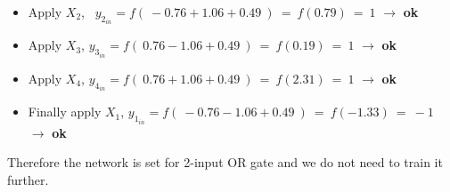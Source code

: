 \documentclass[12pt]{article}
\begin{document}
\begin{itemize}
	\item Apply $X_2$, \ $y_{2_{in}} = f(\ -0.76 + 1.06 + 0.49\ ) \ = \ f(0.79) \ = \ 1 $ $\rightarrow$ \textbf{ok}
	
	\item Apply $X_3$, $y_{3_{in}} = f(\ 0.76 - 1.06 + 0.49\ ) \ = \ f(0.19) \ = \ 1 $ $\rightarrow$ \textbf{ok}
	
	\item Apply $X_4$, $y_{4_{in}} = f(\ 0.76 + 1.06 + 0.49\ ) \ = \ f(2.31) \ = \ 1 $ $\rightarrow$ \textbf{ok}
	
	\item Finally apply $X_1$, $y_{1_{in}} = f(\ -0.76 - 1.06 + 0.49\ ) \ = \ f(-1.33) \ = \ -1 $ $\rightarrow$ \textbf{ok}
	
	
	
\end{itemize}

Therefore the network is set for 2-input OR gate and we do not need to train it further.
\end{document}
